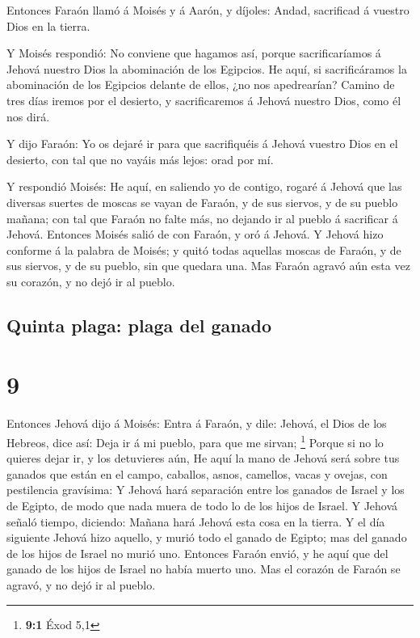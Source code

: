  Entonces Faraón llamó á Moisés y á Aarón, y díjoles:
Andad, sacrificad á vuestro Dios en la tierra.

 Y Moisés respondió: No conviene que hagamos así, porque
sacrificaríamos á Jehová nuestro Dios la abominación de los Egipcios. He
aquí, si sacrificáramos la abominación de los Egipcios delante de ellos,
¿no nos apedrearían?  Camino de tres días iremos por el
desierto, y sacrificaremos á Jehová nuestro Dios, como él nos dirá.

 Y dijo Faraón: Yo os dejaré ir para que sacrifiquéis á
Jehová vuestro Dios en el desierto, con tal que no vayáis más lejos:
orad por mí.

 Y respondió Moisés: He aquí, en saliendo yo de contigo,
rogaré á Jehová que las diversas suertes de moscas se vayan de Faraón, y
de sus siervos, y de su pueblo mañana; con tal que Faraón no falte más,
no dejando ir al pueblo á sacrificar á Jehová.  Entonces
Moisés salió de con Faraón, y oró á Jehová.  Y Jehová
hizo conforme á la palabra de Moisés; y quitó todas aquellas moscas de
Faraón, y de sus siervos, y de su pueblo, sin que quedara una.
 Mas Faraón agravó aún esta vez su corazón, y no dejó ir
al pueblo.

\hypertarget{quinta-plaga-plaga-del-ganado}{%
\subsection{Quinta plaga: plaga del
ganado}\label{quinta-plaga-plaga-del-ganado}}

\hypertarget{section-8}{%
\section{9}\label{section-8}}

 Entonces Jehová dijo á Moisés: Entra á Faraón, y dile:
Jehová, el Dios de los Hebreos, dice así: Deja ir á mi pueblo, para que
me sirvan; \footnote{\textbf{9:1} Éxod 5,1}  Porque si no
lo quieres dejar ir, y los detuvieres aún,  He aquí la
mano de Jehová será sobre tus ganados que están en el campo, caballos,
asnos, camellos, vacas y ovejas, con pestilencia gravísima:
 Y Jehová hará separación entre los ganados de Israel y
los de Egipto, de modo que nada muera de todo lo de los hijos de Israel.
 Y Jehová señaló tiempo, diciendo: Mañana hará Jehová esta
cosa en la tierra.  Y el día siguiente Jehová hizo
aquello, y murió todo el ganado de Egipto; mas del ganado de los hijos
de Israel no murió uno.  Entonces Faraón envió, y he aquí
que del ganado de los hijos de Israel no había muerto uno. Mas el
corazón de Faraón se agravó, y no dejó ir al pueblo.

